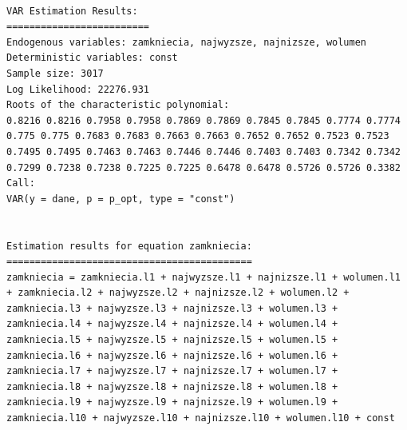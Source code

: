 \documentclass[
  polish,
  letterpaper,
  DIV=11,
  numbers=noendperiod]{scrartcl}
\begin{document}
\begin{verbatim}

VAR Estimation Results:
========================= 
Endogenous variables: zamkniecia, najwyzsze, najnizsze, wolumen 
Deterministic variables: const 
Sample size: 3017 
Log Likelihood: 22276.931 
Roots of the characteristic polynomial:
0.8216 0.8216 0.7958 0.7958 0.7869 0.7869 0.7845 0.7845 0.7774 0.7774 0.775 0.775 0.7683 0.7683 0.7663 0.7663 0.7652 0.7652 0.7523 0.7523 0.7495 0.7495 0.7463 0.7463 0.7446 0.7446 0.7403 0.7403 0.7342 0.7342 0.7299 0.7238 0.7238 0.7225 0.7225 0.6478 0.6478 0.5726 0.5726 0.3382
Call:
VAR(y = dane, p = p_opt, type = "const")


Estimation results for equation zamkniecia: 
=========================================== 
zamkniecia = zamkniecia.l1 + najwyzsze.l1 + najnizsze.l1 + wolumen.l1 + zamkniecia.l2 + najwyzsze.l2 + najnizsze.l2 + wolumen.l2 + zamkniecia.l3 + najwyzsze.l3 + najnizsze.l3 + wolumen.l3 + zamkniecia.l4 + najwyzsze.l4 + najnizsze.l4 + wolumen.l4 + zamkniecia.l5 + najwyzsze.l5 + najnizsze.l5 + wolumen.l5 + zamkniecia.l6 + najwyzsze.l6 + najnizsze.l6 + wolumen.l6 + zamkniecia.l7 + najwyzsze.l7 + najnizsze.l7 + wolumen.l7 + zamkniecia.l8 + najwyzsze.l8 + najnizsze.l8 + wolumen.l8 + zamkniecia.l9 + najwyzsze.l9 + najnizsze.l9 + wolumen.l9 + zamkniecia.l10 + najwyzsze.l10 + najnizsze.l10 + wolumen.l10 + const 


\end{verbatim}
\end{document}
